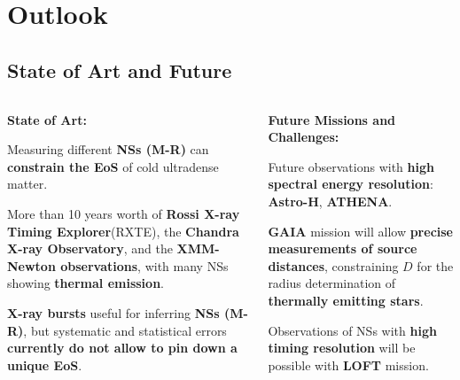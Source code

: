 \section{Outlook}

\subsection*{State of Art and Future}
\begin{frame}
\begin{columns}[c]
\begin{column}{0.55\textwidth} 
{\bf \center State of Art:}

\quad

\begin{enumerate}
\scriptsize{
 \item Measuring different {\bf NSs (M-R)} can {\bf constrain the EoS} of cold ultradense matter.
 
 \quad
 
 \item  More than 10 years worth of {\bf Rossi X-ray Timing Explorer}(RXTE), the {\bf Chandra X-ray Observatory}, and the {\bf XMM-Newton observations}, with many NSs showing {\bf thermal emission}.
 
 \quad
 
  \item {\bf X-ray bursts}  useful for inferring {\bf NSs (M-R)}, but systematic and statistical errors  {\bf currently do not allow to pin down a unique EoS}. 
  
}
\end{enumerate}
\end{column}

\begin{column}{0.55\textwidth}  
{\bf \center Future Missions and Challenges:}
\begin{enumerate}\scriptsize{
 \item Future observations with {\bf high spectral energy resolution}: {\bf Astro-H}, {\bf ATHENA}.
 

   
 \quad
 
 \item {\bf GAIA} mission will allow {\bf precise measurements of source distances}, constraining $D$ for the radius determination of {\bf thermally emitting stars}.
 
 
 
 \quad
 
 \item Observations of NSs with {\bf  high timing resolution} will be possible with {\bf LOFT} mission.
 
}
\end{enumerate}
\end{column}
\end{columns}
\end{frame}
